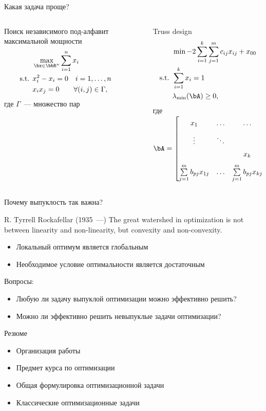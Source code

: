 \documentclass[12pt]{beamer}
\begin{document}
\begin{frame}{Какая задача проще?}

\begin{columns}[T]
\begin{column}{0.5\textwidth}
Поиск независимого под-алфавит максимальной мощности
\begin{equation*}
\begin{split}
&\max\limits_{\bx \in \bbR^n} \sum\limits_{i=1}^n x_i\\
\text{s.t. } & x_i^2 - x_i = 0 \quad i = 1,\ldots, n\\
& x_ix_j = 0 \qquad \forall (i, j) \in \Gamma,
\end{split}
\end{equation*}
где $\Gamma$~--- множество пар
\end{column}
~
\begin{column}{0.5\textwidth}
\small
Truss design
\begin{equation*}
\begin{split}
& \min -2\sum\limits_{i=1}^k\sum\limits_{j=1}^m c_{ij} x_{ij} + x_{00}\\
\text{s.t. } & \sum\limits_{i=1}^k x_i = 1\\
& \lambda_{\min}(\bA) \geq 0,
\end{split}
\end{equation*}
\scriptsize
где $\bA = 
\begin{bmatrix}
x_1 & \ldots & \ldots & \sum\limits_{j=1}^m b_{pj}x_{1j}\\
\vdots & \ddots & & \vdots\\
 & & x_k & \sum\limits_{j=1}^m b_{pj}x_{kj}\\
\sum\limits_{j=1}^m b_{pj}x_{1j} & \ldots & \sum\limits_{j=1}^m b_{pj}x_{kj} & x_{00}
\end{bmatrix}
$
\end{column}
\end{columns}

\end{frame}

\begin{frame}{Почему выпуклость так важна?}
\begin{block}{R. Tyrrell Rockafellar (1935~---)}
The great watershed in optimization is not between linearity and
non-linearity, but convexity and non-convexity.
\end{block}
\begin{itemize}
\item Локальный оптимум является глобальным
\item Необходимое условие оптимальности является достаточным
\end{itemize}
Вопросы:
\begin{itemize}
\item Любую ли задачу выпуклой оптимизации можно эффективно решить?
\item Можно ли эффективно решить невыпуклые задачи оптимизации?
\end{itemize}
\end{frame}

\begin{frame}{Резюме}
\begin{itemize}
\item Организация работы
\item Предмет курса по оптимизации
\item Общая формулировка оптимизационной задачи
\item Классические оптимизационные задачи
\end{itemize}
\end{frame}
\end{document}

